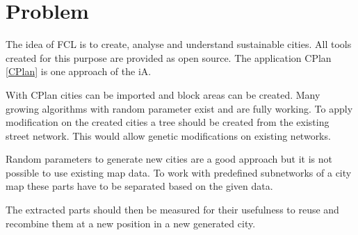 \chapter{Problem}
The idea of \gls{FCL} is to create, analyse and understand sustainable cities. All tools created for this purpose are provided as open source. The application CPlan \ref{CPlan} is one approach of the  \acrlong{iA}.

With CPlan cities can be imported and block areas can be created. Many growing algorithms with random parameter exist and are fully working. To apply modification on the created cities a tree should be created from the existing street network. This would allow genetic modifications on existing networks.

Random parameters to generate new cities are a good approach but it is not possible to use existing map data. To work with predefined subnetworks of a city map these parts have to be separated based on the given data.

The extracted parts should then be measured for their usefulness to reuse and recombine them at a new position in a new generated city.
